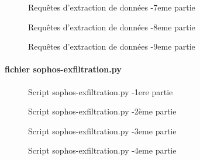 \documentclass[a4paper, 11pt]{article}
\begin{document}
\par\bigskip
\begin{figure}[H]
  
  \caption{Requêtes d'extraction de données -7eme partie}
  \label{fig:extraction-access-7}
\end{figure}
\par\bigskip
\begin{figure}[H]
  
  \caption{Requêtes d'extraction de données -8eme partie}
  \label{fig:extraction-access-8}
\end{figure}
\par\bigskip
\begin{figure}[H]
  
  \caption{Requêtes d'extraction de données -9eme partie}
  \label{fig:extraction-access-9}
\end{figure}
\par\bigskip

\paragraph*{fichier sophos-exfiltration.py}
\begin{figure}[H]
  
  \caption{Script sophos-exfiltration.py -1ere partie}
  \label{fig:sophos-integration}
\end{figure}
\par\bigskip
\begin{figure}[H]
  
  \caption{Script sophos-exfiltration.py -2ème partie}
  \label{fig:sophos-integration-2}
\end{figure}
\par\bigskip
\begin{figure}[H]
  
  \caption{Script sophos-exfiltration.py -3eme partie}
  \label{fig:sophos-integration-3}
\end{figure}
\par\bigskip
\begin{figure}[H]
  
  \caption{Script sophos-exfiltration.py -4eme partie}
  \label{fig:sophos-integration-4}
\end{figure}
\par\bigskip
\end{document}
